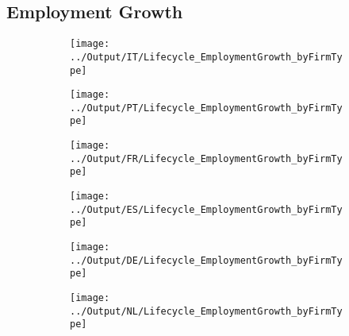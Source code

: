 \documentclass[12pt,notitlepage]{article}
\begin{document}

\subsection{Employment Growth} %
\label{sec:employment_growth}

\begin{figure}[!htpb]
\centering
\caption{Average Employment Growth by Year}
\begin{subfigure}{.49\textwidth}
    \centering
 \texttt{[image: ../Output/IT/Lifecycle\_EmploymentGrowth\_byFirmType]}
\end{subfigure}%
\begin{subfigure}{.49\textwidth}
    \centering
 \texttt{[image: ../Output/PT/Lifecycle\_EmploymentGrowth\_byFirmType]}
\end{subfigure}
\begin{subfigure}{.49\textwidth}
    \centering
 \texttt{[image: ../Output/FR/Lifecycle\_EmploymentGrowth\_byFirmType]}
\end{subfigure}%
\begin{subfigure}{.49\textwidth}
    \centering
 \texttt{[image: ../Output/ES/Lifecycle\_EmploymentGrowth\_byFirmType]}
\end{subfigure}
\begin{subfigure}{.49\textwidth}
    \centering
 \texttt{[image: ../Output/DE/Lifecycle\_EmploymentGrowth\_byFirmType]}
\end{subfigure}
\begin{subfigure}{.49\textwidth}
    \centering
 \texttt{[image: ../Output/NL/Lifecycle\_EmploymentGrowth\_byFirmType]}
\end{subfigure}
\end{figure}
\pagebreak
\end{document}
